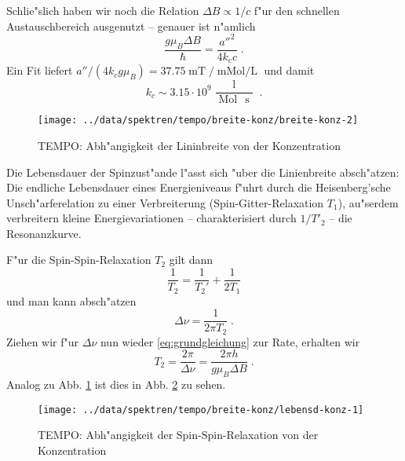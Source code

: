 \documentclass[a4paper,12pt]{article}
\newcommand{\abs}[0]{\bigskip\noindent}
\begin{document}
Schlie"slich haben wir noch die Relation $\Delta B \propto 1/c$
f"ur den schnellen Austauschbereich ausgenutzt -- genauer ist n"amlich
\begin{equation}
  \label{eq:21}
  \frac{ g \mu_B \Delta B } \hbar = \frac{ a''^2 }{ 4 k_c c } \;.
\end{equation}
Ein Fit liefert $a'' / (4 k_c g \mu_B) = 37.75
\operatorname{mT}/\operatorname{mMol/L}$ und damit
\begin{equation*}
  k_c \sim 3.15 \cdot 10^9 \frac{ \operatorname{l}
  }{\operatorname{Mol} \, \operatorname{s}} \;.
\end{equation*}


\begin{figure}[!h]
  \centering
  \texttt{[image: ../data/spektren/tempo/breite-konz/breite-konz-2]}
  \caption{TEMPO: Abh"angigkeit der Lininbreite von der Konzentration}
  \label{fig:tempo_linienbreite-konz}
\end{figure}



\abs
%
Die Lebensdauer der Spinzust"ande l"asst sich "uber die
Linienbreite absch"atzen: Die endliche Lebensdauer eines
Energieniveaus f"uhrt durch die Heisenberg'sche Unsch"arferelation zu
einer Verbreiterung (Spin-Gitter-Relaxation $T_1$), au"serdem
verbreitern kleine Energievariationen -- charakterisiert durch
$1/T'_2$ -- die Resonanzkurve.

F"ur die Spin-Spin-Relaxation $T_2$ gilt dann
\begin{equation}
  \label{eq:20}
  \frac 1 {T_2} = \frac 1 {T_2'} + \frac 1 {2T_1}
\end{equation}
und man kann absch"atzen
\begin{equation}
  \label{eq:23}
\Delta \nu = \frac 1 {2\pi T_2 } \;.
\end{equation}
Ziehen wir f"ur $\Delta \nu$ nun wieder \eqref{eq:grundgleichung} zur
Rate, erhalten wir
\begin{equation}
  \label{eq:22}
  T_2 = \frac{ 2\pi }{ \Delta \nu } = 
\frac{ 2\pi h }{ g \mu_B \Delta B } \;.
\end{equation}
Analog zu Abb. \ref{fig:tempo_linienbreite-konz} ist dies in
Abb. \ref{fig:tempo_lebensdauer-konz} zu sehen.

\begin{figure}[!h]
  \centering
  \texttt{[image: ../data/spektren/tempo/breite-konz/lebensd-konz-1]}
  \caption{TEMPO: Abh"angigkeit der Spin-Spin-Relaxation von der Konzentration}
  \label{fig:tempo_lebensdauer-konz}
\end{figure}
\end{document}
